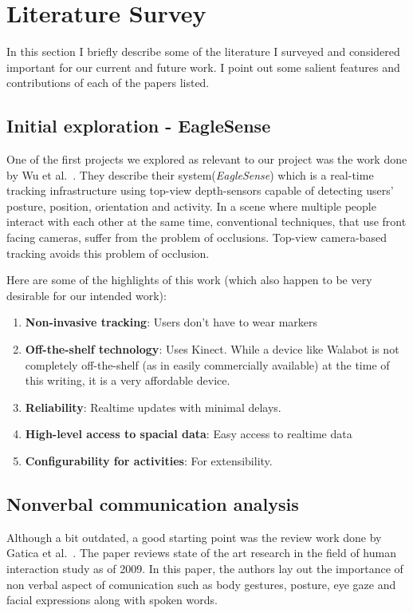 \section{Literature Survey} \label{literature_survey}

In this section I briefly describe some of the literature I surveyed
and considered important for our current and future work. I point out
some salient features and contributions of each of the papers listed.


\subsection{Initial exploration - EagleSense}
One of the first projects we explored as relevant to our project was
the work done by Wu et
al.~\cite{18b6b9f75d1645c0a1433a2ce7bfce0f}. They describe their
system(\emph{EagleSense}) which is a real-time tracking infrastructure
using top-view depth-sensors capable of detecting users' posture,
position, orientation and activity. In a scene where multiple people
interact with each other at the same time, conventional techniques,
that use front facing cameras, suffer from the problem of
occlusions. Top-view camera-based tracking avoids this problem of occlusion.

Here are some of the highlights of this work (which also happen to be
very desirable for our intended work):

\begin{enumerate}
\item \textbf{Non-invasive tracking}: Users don't have to wear markers
\item \textbf{Off-the-shelf technology}: Uses Kinect. While a device
  like Walabot is not completely off-the-shelf (as in easily
  commercially available) at the time of this writing, it is a very
  affordable device.
\item \textbf{Reliability}: Realtime updates with minimal delays.
\item \textbf{High-level access to spacial data}: Easy access to
  realtime data
\item \textbf{Configurability for activities}: For extensibility.
\end{enumerate}


\subsection{Nonverbal communication analysis}
Although a bit outdated, a good starting point was the review work
done by Gatica et
al.~\cite{Gatica-Perez:2009:ANA:1621144.1621313}. The paper reviews
state of the art research in the field of human interaction study as
of 2009. In this paper, the authors lay out the importance of non
verbal aspect of comunication such as body gestures, posture, eye gaze
and facial expressions along with spoken words.

